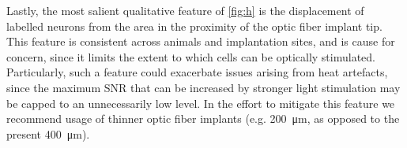 Lastly, the most salient qualitative feature of \cref{fig:h} is the displacement of labelled neurons from the area in the proximity of the optic fiber implant tip.
This feature is consistent across animals and implantation sites, and is cause for concern, since it limits the extent to which cells can be optically stimulated.
Particularly, such a feature could exacerbate issues arising from heat artefacts, since the maximum SNR that can be increased by stronger light stimulation may be capped to an unnecessarily low level.
In the effort to mitigate this feature we recommend usage of thinner optic fiber implants (e.g. \SI{200}{\micro\meter}, as opposed to the present \SI{400}{\micro\meter}).
